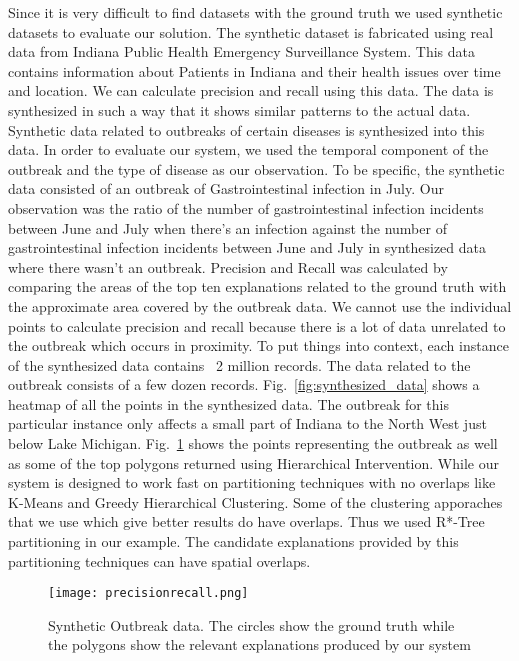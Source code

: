 Since it is very difficult to find datasets with the ground truth we used synthetic datasets to evaluate our solution\citep{maciejewski2009generating}. The synthetic dataset is fabricated using real data from Indiana Public Health Emergency Surveillance System. This data contains information about Patients in Indiana and their health issues over time and location. We can calculate precision and recall using this data\citep{powers2011evaluation}. The data is synthesized in such a way that it shows similar patterns to the actual data. Synthetic data related to outbreaks of certain diseases is synthesized into this data. In order to evaluate our system, we used the temporal component of the outbreak and the type of disease as our observation. To be specific, the synthetic data consisted of an outbreak of Gastrointestinal infection in July. Our observation was the ratio of the number of gastrointestinal infection incidents between June and July when there's an infection against the number of gastrointestinal infection incidents between June and July in synthesized data where there wasn't an outbreak. Precision and Recall was calculated by comparing the areas of the top ten explanations related to the ground truth with the approximate area covered by the outbreak data. We cannot use the individual points to calculate precision and recall because there is a lot of data unrelated to the outbreak which occurs in proximity. To put things into context, each instance of the synthesized data contains ~2 million records. The data related to the outbreak consists of a few dozen records. Fig.~\ref{fig:synthesized_data} shows a heatmap of all the points in the synthesized data. The outbreak for this particular instance only affects a small part of Indiana to the North West just below Lake Michigan. Fig.~\ref{fig:precisionrecall} shows the points representing the outbreak as well as some of the top polygons returned using Hierarchical Intervention. While our system is designed to work fast on partitioning techniques with no overlaps like K-Means and Greedy Hierarchical Clustering. Some of the clustering apporaches that we use which give better results do have overlaps. Thus we used R*-Tree partitioning in our example. The candidate explanations provided by this partitioning techniques can have spatial overlaps.

\begin{figure}[h]
\texttt{[image: precisionrecall.png]}
\caption{Synthetic Outbreak data. The circles show the ground truth while the polygons show the relevant explanations produced by our system}
\label{fig:precisionrecall}
\end{figure}

